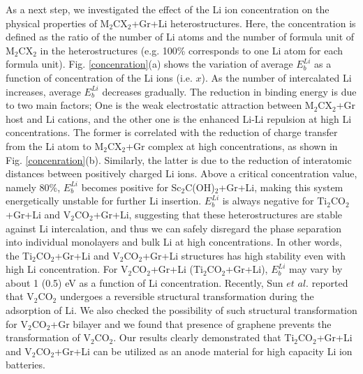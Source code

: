 As a next step, we investigated the effect of the Li ion concentration on the physical properties of M$_2$CX$_2$+Gr+Li heterostructures. Here, the concentration is defined as the ratio of the number of Li atoms and the number of formula unit of M$_2$CX$_2$ in the heterostructures (e.g. 100\% corresponds to one Li atom for each formula unit). Fig. \ref{concenration}(a) shows the variation of average $E_{b}^{Li}$ as a function of concentration of the Li ions (i.e. $x$). As the number of intercalated Li increases,  average $E_{b}^{Li}$ decreases gradually. The reduction in binding energy is due to two main factors; One is the weak electrostatic attraction between M$_2$CX$_2$+Gr host and Li cations, and the other one is the enhanced Li-Li repulsion at high Li concentrations. The former is correlated with the reduction of charge transfer from the Li atom to M$_2$CX$_2$+Gr complex at high concentrations, as shown in Fig. \ref{concenration}(b). Similarly, the latter is due to the reduction of interatomic distances between positively charged Li ions. Above a critical concentration value, namely 80\%,  $E_{b}^{Li}$ becomes positive for Sc$_2$C(OH)$_2$+Gr+Li, making this system energetically unstable for further Li insertion.  $E_{b}^{Li}$ is always negative for Ti$_2$CO$_2$+Gr+Li and V$_2$CO$_2$+Gr+Li, suggesting that these heterostructures are stable against Li intercalation, and thus we can safely disregard the phase separation into individual monolayers and bulk Li at high concentrations. In other words, the Ti$_2$CO$_2$+Gr+Li and V$_2$CO$_2$+Gr+Li structures has high stability even with high Li concentration. For V$_2$CO$_2$+Gr+Li (Ti$_2$CO$_2$+Gr+Li), $E_{b}^{Li}$ may vary by about 1 (0.5) eV as a function of Li concentration. Recently, Sun $et$ $al.$ \citet{doi:10.1021/acsami.5b03863}reported that V$_2$CO$_2$ undergoes a reversible structural transformation during the adsorption of Li. We also checked the possibility of such structural transformation for V$_2$CO$_2$+Gr bilayer and we found that presence of graphene prevents the transformation of V$_2$CO$_2$. Our results clearly demonstrated that Ti$_2$CO$_2$+Gr+Li and V$_2$CO$_2$+Gr+Li can be utilized as an anode material for high capacity Li ion batteries.

